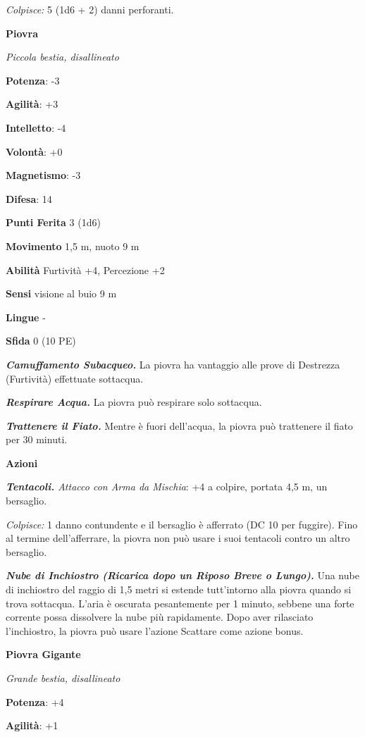 \begin{multicols}{2}
\emph{Colpisce:} 5 (1d6 + 2) danni perforanti.



\textbf{Piovra}

\emph{Piccola bestia, disallineato}

\textbf{Potenza}: -3

\textbf{Agilità}: +3

\textbf{Intelletto}: -4

\textbf{Volontà}: +0

\textbf{Magnetismo}: -3

\textbf{Difesa}: 14

\textbf{Punti Ferita} 3 (1d6)

\textbf{Movimento} 1,5 m, nuoto 9 m

\textbf{Abilità} Furtività +4, Percezione +2

\textbf{Sensi} visione al buio 9 m

\textbf{Lingue} -

\textbf{Sfida} 0 (10 PE)

\emph{\textbf{Camuffamento Subacqueo.}} La piovra ha vantaggio alle
prove di Destrezza (Furtività) effettuate sottacqua.

\emph{\textbf{Respirare Acqua.}} La piovra può respirare solo sottacqua.

\emph{\textbf{Trattenere il Fiato.}} Mentre è fuori dell'acqua, la
piovra può trattenere il fiato per 30 minuti.

\textbf{Azioni}

\emph{\textbf{Tentacoli.} Attacco con Arma da Mischia}: +4 a colpire,
portata 4,5 m, un bersaglio.

\emph{Colpisce:} 1 danno contundente e il bersaglio è afferrato (DC 10
per fuggire). Fino al termine dell'afferrare, la piovra non può usare i
suoi tentacoli contro un altro bersaglio.

\emph{\textbf{Nube di Inchiostro (Ricarica dopo un Riposo Breve o
Lungo).}} Una nube di inchiostro del raggio di 1,5 metri si estende
tutt'intorno alla piovra quando si trova sottacqua. L'aria è oscurata
pesantemente per 1 minuto, sebbene una forte corrente possa dissolvere
la nube più rapidamente. Dopo aver rilasciato l'inchiostro, la piovra
può usare l'azione Scattare come azione bonus.

\textbf{Piovra Gigante}

\emph{Grande bestia, disallineato}

\textbf{Potenza}: +4

\textbf{Agilità}: +1


\end{multicols}

